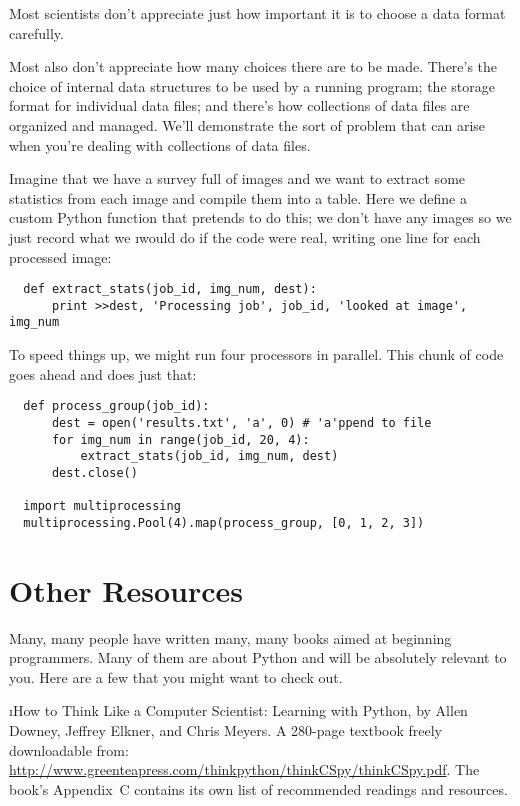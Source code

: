 \documentclass[letterpaper, 12pt, titlepage, twoside]{article}
\begin{document}
Most scientists don't appreciate just how important it is to choose a data
format carefully.

Most also don't appreciate how many choices there are to be made. There's the
choice of internal data structures to be used by a running program; the
storage format for individual data files; and there's how collections of data
files are organized and managed. We'll demonstrate the sort of problem that
can arise when you're dealing with collections of data files.

Imagine that we have a survey full of images and we want to extract some
statistics from each image and compile them into a table. Here we define a
custom Python function that pretends to do this; we don't have any images so
we just record what we \i{would} do if the code were real, writing one line
for each processed image:

\begin{lstlisting}
  def extract_stats(job_id, img_num, dest):
      print >>dest, 'Processing job', job_id, 'looked at image', img_num
\end{lstlisting}

To speed things up, we might run four processors in parallel. This chunk of
code goes ahead and does just that:

\begin{lstlisting}
  def process_group(job_id):
      dest = open('results.txt', 'a', 0) # 'a'ppend to file
      for img_num in range(job_id, 20, 4):
          extract_stats(job_id, img_num, dest)
      dest.close()

  import multiprocessing
  multiprocessing.Pool(4).map(process_group, [0, 1, 2, 3])        
\end{lstlisting}




\newpage
\section*{Other Resources}

Many, many people have written many, many books aimed at beginning
programmers. Many of them are about Python and will be absolutely relevant to
you. Here are a few that you might want to check out.

\i{How to Think Like a Computer Scientist: Learning with Python}, by Allen
Downey, Jeffrey Elkner, and Chris Meyers. A 280-page textbook freely
downloadable from:
\url{http://www.greenteapress.com/thinkpython/thinkCSpy/thinkCSpy.pdf}. The
book's Appendix~C contains its own list of recommended readings and resources.
\end{document}
